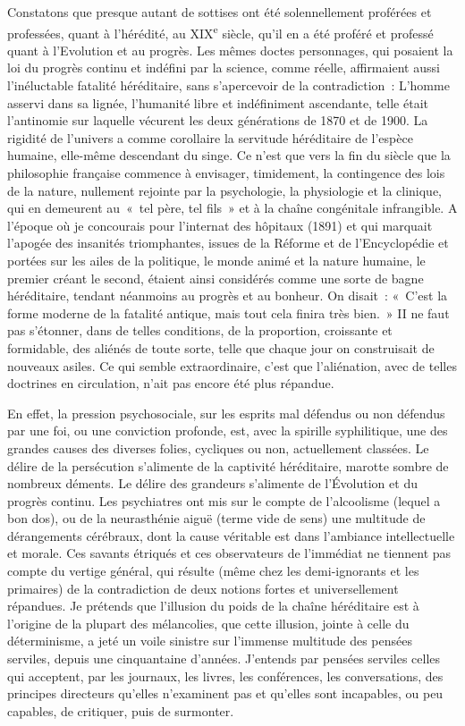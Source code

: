 \documentclass[french,twoside]{book} %
\begin{document}
Constatons que presque autant de sottises ont été solennellement proférées et professées, quant à l’hérédité, au XIX\textsuperscript{e} siècle, qu’il en a été proféré et professé quant à l’Evolution et au progrès. Les mêmes doctes personnages, qui posaient la loi du progrès continu et indéfini par la science, comme réelle, affirmaient aussi l’inéluctable fatalité héréditaire, sans s’apercevoir de la contradiction : L’homme asservi dans sa lignée, l’humanité libre et indéfiniment ascendante, telle était l’antinomie sur laquelle vécurent les deux générations de 1870 et de 1900. La rigidité de l’univers a comme corollaire la servitude héréditaire de l’espèce humaine, elle-même descendant du singe. Ce n’est que vers la fin du siècle que la philosophie française commence à envisager, timidement, la contingence des lois de la nature, nullement rejointe par la psychologie, la physiologie et la clinique, qui en demeurent au « tel père, tel fils » et à la chaîne congénitale infrangible. A l’époque où je concourais pour l’internat des hôpitaux (1891) et qui marquait l’apogée des insanités triomphantes, issues de la Réforme et de l’Encyclopédie et portées sur les ailes de la politique, le monde animé et la nature humaine, le premier créant le second, étaient ainsi considérés comme une sorte de bagne héréditaire, tendant néanmoins au progrès et au bonheur. On disait : « C’est la forme moderne de la fatalité antique, mais tout cela finira très bien. » II ne faut pas s’étonner, dans de telles conditions, de la proportion, croissante et formidable, des aliénés de toute sorte, telle que chaque jour on construisait de nouveaux asiles. Ce qui semble extraordinaire, c’est que l’aliénation, avec de telles doctrines en circulation, n’ait pas encore été plus répandue.\par
En effet, la pression psychosociale, sur les esprits mal défendus ou non défendus par une foi, ou une conviction profonde, est, avec la spirille syphilitique, une des grandes causes des diverses folies, cycliques ou non, actuellement classées. Le délire de la persécution s’alimente de la captivité héréditaire, marotte sombre de nombreux déments. Le délire des grandeurs s’alimente de l’Évolution et du progrès continu. Les psychiatres ont mis sur le compte de l’alcoolisme (lequel a bon dos), ou de la neurasthénie aiguë (terme vide de sens) une multitude de dérangements cérébraux, dont la cause véritable est dans l’ambiance intellectuelle et morale. Ces savants étriqués et ces observateurs de l’immédiat ne tiennent pas compte du vertige général, qui résulte (même chez les demi-ignorants et les primaires) de la contradiction de deux notions fortes et universellement répandues. Je prétends que l’illusion du poids de la chaîne héréditaire est à l’origine de la plupart des mélancolies, que cette illusion, jointe à celle du déterminisme, a jeté un voile sinistre sur l’immense multitude des pensées serviles, depuis une cinquantaine d’années. J’entends par pensées serviles celles qui acceptent, par les journaux, les livres, les conférences, les conversations, des principes directeurs qu’elles n’examinent pas et qu’elles sont incapables, ou peu capables, de critiquer, puis de surmonter.\par
\end{document}
